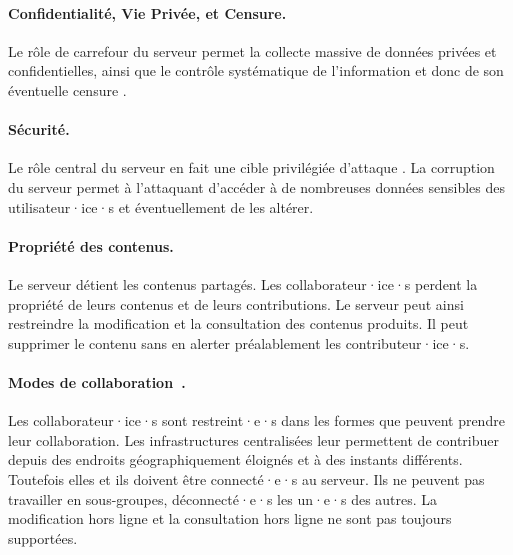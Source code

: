 
\paragraph{Confidentialité, Vie Privée, et Censure.}
Le rôle de carrefour du serveur permet la collecte massive de données privées et confidentielles, ainsi que le contrôle systématique de l'information et donc de son éventuelle censure \autocite{jard2016_langage}.

\paragraph{Sécurité.}
Le rôle central du serveur en fait une cible privilégiée d'attaque \autocite{jard2016_langage}.
La corruption du serveur permet à l'attaquant d'accéder à de nombreuses données sensibles des utilisateur·ice·s et éventuellement de les altérer.

\paragraph{Propriété des contenus.}
Le serveur détient les contenus partagés.
Les collaborateur·ice·s perdent la propriété de leurs contenus et de leurs contributions.
Le serveur peut ainsi restreindre la modification et la consultation des contenus produits.
Il peut supprimer le contenu sans en alerter préalablement les contributeur·ice·s.

\paragraph{Modes de collaboration~\autocite{dourish_1995_divergence}.}
Les collaborateur·ice·s sont restreint·e·s dans les formes que peuvent prendre leur collaboration.
Les infrastructures centralisées leur permettent de contribuer depuis des endroits géographiquement éloignés et à des instants différents.
Toutefois elles et ils doivent être connecté·e·s au serveur.
Ils ne peuvent pas travailler en sous-groupes, déconnecté·e·s les un·e·s des autres.
La modification hors ligne et la consultation hors ligne ne sont pas toujours supportées.

